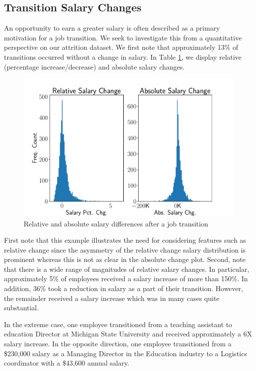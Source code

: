 \documentclass[10pt]{article}
\begin{document}
\subsection{Transition Salary Changes}
An opportunity to earn a greater salary is often described as a primary motivation 
for a job transition.  We seek to investigate this from a quantitative perspective 
on our attrition dataset.  We first note that approximately 
13\% of transitions occurred without a change in salary. 
In Table \ref{fig:salgr}, we display relative (percentage increase/decrease) and  
absolute salary changes. 
%
\begin{figure}[thb]
    \centering
    \includegraphics[width=1.0\linewidth]{salgr.pdf}
	\caption{Relative and absolute salary differences after a job transition}
	\label{fig:salgr}
\end{figure}
%
First note that this example illustrates the need for considering 
features such as relative change since the asymmetry of the relative change salary distribution is 
prominent whereas this is not as clear in the absolute change plot.  
Second, note that there is a wide range of magnitudes of relative salary changes.  In particular, 
approximately 5\% of employees received a salary increase of more than 150\%.  In 
addition, 36\% took a reduction in salary as a part of their transition.  However, the remainder 
received a salary increase which was in many cases quite substantial. 

In the extreme case, one employee transitioned from a teaching assistant to 
education Director at Michigan State University and received approximately a 6X 
salary increase.  In the opposite direction, one employee transitioned from a \$230,000 
salary as a Managing Director in the Education industry to a Logistics coordinator 
with a \$43,600 annual salary. 
\end{document}
